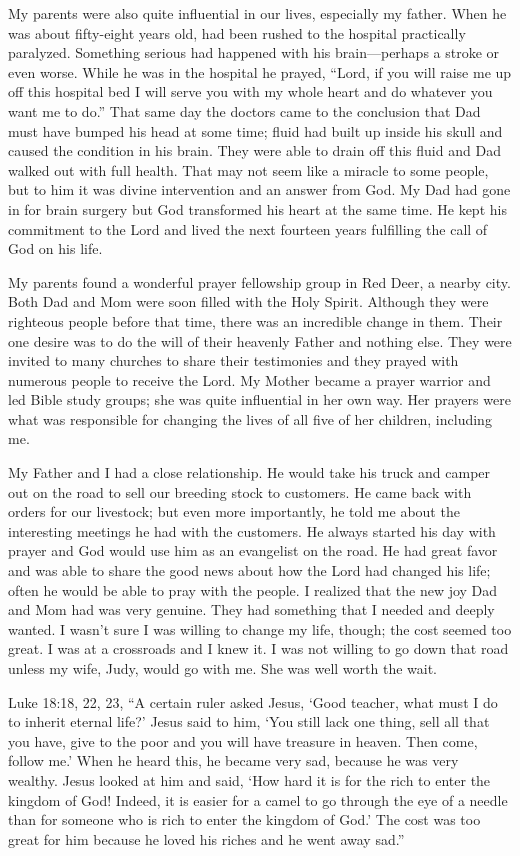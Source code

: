 \documentclass[oneside]{book}
\begin{document}
My parents were also quite influential in our lives, especially my father. When he was about fifty-eight years old, had been rushed to the hospital practically paralyzed. Something serious had happened with his brain—perhaps a stroke or even worse. While he was in the hospital he prayed, “Lord, if you will raise me up off this hospital bed I will serve you with my whole heart and do whatever you want me to do.” That same day the doctors came to the conclusion that Dad must have bumped his head at some time; fluid had built up inside his skull and caused the condition in his brain. They were able to drain off this fluid and Dad walked out with full health. That may not seem like a miracle to some people, but to him it was divine intervention and an answer from God. My Dad had gone in for brain surgery but God transformed his heart at the same time. He kept his commitment to the Lord and lived the next fourteen years fulfilling the call of God on his life.

My parents found a wonderful prayer fellowship group in Red Deer, a nearby city. Both Dad and Mom were soon filled with the Holy Spirit. Although they were righteous people before that time, there was an incredible change in them. Their one desire was to do the will of their heavenly Father and nothing else. They were invited to many churches to share their testimonies and they prayed with numerous people to receive the Lord. My Mother became a prayer warrior and led Bible study groups; she was quite influential in her own way. Her prayers were what was responsible for changing the lives of all five of her children, including me.

My Father and I had a close relationship. He would take his truck and camper out on the road to sell our breeding stock to customers. He came back with orders for our livestock; but even more importantly, he told me about the interesting meetings he had with the customers. He always started his day with prayer and God would use him as an evangelist on the road. He had great favor and was able to share the good news about how the Lord had changed his life; often he would be able to pray with the people. I realized that the new joy Dad and Mom had was very genuine. They had something that I needed and deeply wanted. I wasn't sure I was willing to change my life, though; the cost seemed too great. I was at a crossroads and I knew it. I was not willing to go down that road unless my wife, Judy, would go with me. She was well worth the wait.

Luke 18:18, 22, 23,  “A certain ruler asked Jesus, ‘Good teacher, what must I do to inherit eternal life?' Jesus said to him, ‘You still lack one thing, sell all that you have, give to the poor and you will have treasure in heaven. Then come, follow me.’ When he heard this, he became very sad, because he was very wealthy. Jesus looked at him and said, ‘How hard it is for the rich to enter the kingdom of God! Indeed, it is easier for a camel to go through the eye of a needle than for someone who is rich to enter the kingdom of God.’ The cost was too great for him because he loved his riches and he went away sad.”
\end{document}
